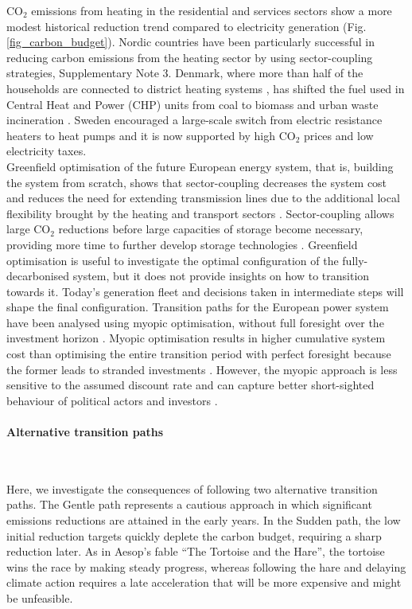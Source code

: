 \documentclass[5p]{elsarticle} %
\begin{document}
CO$_2$ emissions from heating in the residential and services sectors show a more modest historical reduction trend compared to electricity generation (Fig. \ref{fig_carbon_budget}). Nordic countries have been particularly successful in reducing carbon emissions from the heating sector by using sector-coupling strategies, Supplementary Note 3. Denmark, where more than half of the households are connected to district heating systems \cite{Gross_2019}, has shifted the fuel used in Central Heat and Power (CHP) units from coal to biomass and urban waste incineration \cite{DEA_2015}. Sweden encouraged a large-scale switch from electric resistance heaters to heat pumps \cite{Gross_2019} and it is now supported by high CO$_2$ prices \cite{Carbon_pricing_2019} and low electricity taxes.\\ 

Greenfield optimisation of the future European energy system, that is, building the system from scratch, shows that sector-coupling decreases the system cost and reduces the need for extending transmission lines due to the additional local flexibility brought by the heating and transport sectors \cite{Brown_2018}. Sector-coupling allows large CO$_2$ reductions before large capacities of storage become necessary, providing more time to further develop storage technologies \cite{Victoria_2019_storage}. Greenfield optimisation is useful to investigate the optimal configuration of the fully-decarbonised system, but it does not provide insights on how to transition towards it. Today's generation fleet and decisions taken in intermediate steps will shape the final configuration. Transition paths for the European power system have been analysed using myopic optimisation, without full foresight over the investment horizon \cite{Bogdanov_2019, Plesmann_2017, Gerbaulet_2019, Poncelet_2016}. Myopic optimisation results in higher cumulative system cost than optimising the entire transition period with perfect foresight because the former leads to stranded investments \cite{Gerbaulet_2019, Heuberger_2018}. However, the myopic approach is less sensitive to the assumed discount rate and can capture better short-sighted behaviour of political actors and investors \cite{Poncelet_2016, Gerbaulet_2019}. 

\paragraph{\textbf{Alternative transition paths}} \


Here, we investigate the consequences of following two alternative transition paths. The Gentle path represents a cautious approach in which significant emissions reductions are attained in the early years. In the Sudden path, the low initial reduction targets quickly deplete the carbon budget, requiring a sharp reduction later. As in Aesop's fable ``The Tortoise and the Hare'', 
the tortoise wins the race by making steady progress, whereas following the hare and delaying climate action requires a late acceleration that will be more expensive and might be unfeasible. 
\end{document}
